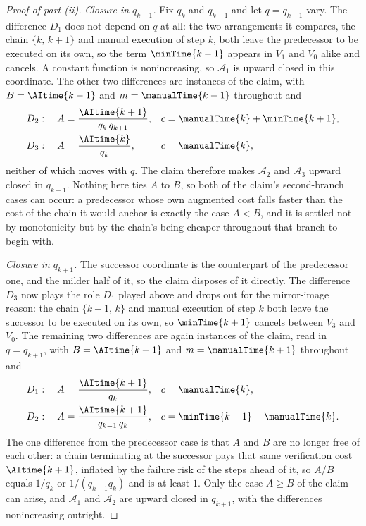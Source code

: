 \begin{proof}[Proof of part (ii)]
\emph{Closure in $q_{k-1}$.}
Fix $q_k$ and $q_{k+1}$ and let $q = q_{k-1}$ vary.
The difference $D_1$ does not depend on $q$ at all: the two arrangements it compares, the chain $\{k,\, k+1\}$ and manual execution of step $k$, both leave the predecessor to be executed on its own, so the term $\minTime{k-1}$ appears in $V_1$ and $V_0$ alike and cancels.
A constant function is nonincreasing, so $\mathcal{A}_1$ is upward closed in this coordinate.
The other two differences are instances of the claim, with $B = \AItime{k-1}$ and $m = \manualTime{k-1}$ throughout and
\begin{align*}
D_2: \quad A &= \frac{\AItime{k+1}}{q_k\, q_{k+1}}, & c &= \manualTime{k} + \minTime{k+1}, \\
D_3: \quad A &= \frac{\AItime{k}}{q_k}, & c &= \manualTime{k},
\end{align*}
neither of which moves with $q$.
The claim therefore makes $\mathcal{A}_2$ and $\mathcal{A}_3$ upward closed in $q_{k-1}$.
Nothing here ties $A$ to $B$, so both of the claim's second-branch cases can occur: a predecessor whose own augmented cost falls faster than the cost of the chain it would anchor is exactly the case $A < B$, and it is settled not by monotonicity but by the chain's being cheaper throughout that branch to begin with.

\emph{Closure in $q_{k+1}$.}
The successor coordinate is the counterpart of the predecessor one, and the milder half of it, so the claim disposes of it directly.
The difference $D_3$ now plays the role $D_1$ played above and drops out for the mirror-image reason: the chain $\{k-1,\, k\}$ and manual execution of step $k$ both leave the successor to be executed on its own, so $\minTime{k+1}$ cancels between $V_3$ and $V_0$.
The remaining two differences are again instances of the claim, read in $q = q_{k+1}$, with $B = \AItime{k+1}$ and $m = \manualTime{k+1}$ throughout and
\begin{align*}
D_1: \quad A &= \frac{\AItime{k+1}}{q_k}, & c &= \manualTime{k}, \\
D_2: \quad A &= \frac{\AItime{k+1}}{q_{k-1}\, q_k}, & c &= \minTime{k-1} + \manualTime{k} .
\end{align*}
The one difference from the predecessor case is that $A$ and $B$ are no longer free of each other: a chain terminating at the successor pays that same verification cost $\AItime{k+1}$, inflated by the failure risk of the steps ahead of it, so $A/B$ equals $1/q_k$ or $1/(q_{k-1} q_k)$ and is at least $1$.
Only the case $A \geq B$ of the claim can arise, and $\mathcal{A}_1$ and $\mathcal{A}_2$ are upward closed in $q_{k+1}$, with the differences nonincreasing outright.


\end{proof}
